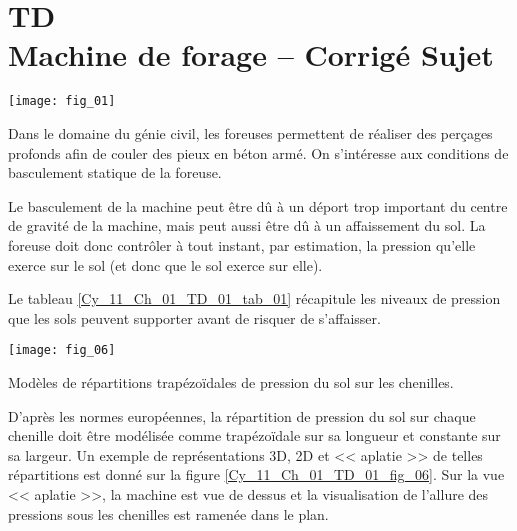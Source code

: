 \chapter*{TD  \\ 
Machine de forage -- \ifprof Corrigé \else Sujet \fi}

\iflivret {} \else
\ifprof  {} \else \fi
\fi

\setcounter{question}{0}

\begin{marginfigure}
\texttt{[image: fig\_01]}
\end{marginfigure}


Dans le domaine du génie civil, les foreuses permettent de réaliser des perçages profonds afin de couler des pieux en béton armé. On s'intéresse aux conditions de basculement statique de la foreuse. 

Le basculement de la machine peut être dû à un déport trop important du centre de gravité 
de la machine, mais peut aussi être dû à un affaissement du sol. La foreuse doit donc contrôler à tout instant, par estimation, la pression qu’elle exerce sur le sol (et donc que le sol exerce sur elle). 

Le tableau \ref{Cy_11_Ch_01_TD_01_tab_01} récapitule les niveaux de pression que les sols peuvent supporter avant de risquer de s’affaisser. 




\begin{marginfigure}
\centering
\texttt{[image: fig\_06]}
\caption{Modèles de répartitions trapézoïdales de pression du sol sur les chenilles. \label{Cy_11_Ch_01_TD_01_fig_06}}
\end{marginfigure}

D’après les normes européennes, 
la répartition de pression du sol sur chaque chenille doit être modélisée comme trapézoïdale sur sa longueur et constante sur sa largeur. Un exemple de représentations 3D, 2D et << aplatie >> 
de telles répartitions est donné sur la figure \ref{Cy_11_Ch_01_TD_01_fig_06}. Sur la vue << aplatie >>, la machine est vue de dessus et la visualisation de l’allure des pressions sous les chenilles est ramenée dans le plan.%

